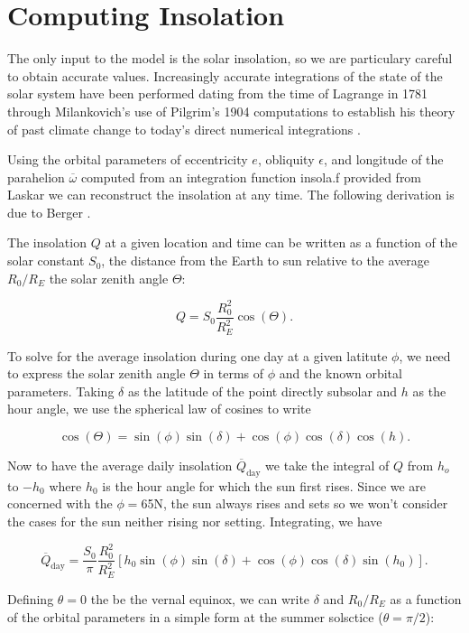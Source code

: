 \section{Computing Insolation}

The only input to the model is the solar insolation, so we are particulary careful to obtain accurate values.
Increasingly accurate integrations of the state of the solar system have been performed dating from the time of Lagrange in 1781 through Milankovich's use of Pilgrim's 1904 computations to establish his theory of past climate change to today's direct numerical integrations \cite{laskar2004long}.

Using the orbital parameters of eccentricity $e$, obliquity $\epsilon$, and longitude of the parahelion $\overline{\omega}$ computed from an integration function insola.f provided from Laskar \cite{laskar2004long} we can reconstruct the insolation at any time.
The following derivation is due to Berger \cite{berger1981long}.

The insolation $Q$ at a given location and time can be written as a function of the solar constant $S_0$, the distance from the Earth to sun relative to the average $R_0/R_E$ the solar zenith angle $\Theta$:

$$ Q = S_0 \frac{R_0^2}{R_E^2} \cos (\Theta) .$$

To solve for the average insolation during one day at a given latitute $\phi$, we need to express the solar zenith angle $\Theta$ in terms of $\phi$ and the known orbital parameters.
Taking $\delta$ as the latitude of the point directly subsolar and $h$ as the hour angle, we use the spherical law of cosines to write

$$ \cos ( \Theta ) = \sin ( \phi ) \sin ( \delta ) + \cos ( \phi ) \cos ( \delta ) \cos ( h ) .$$

Now to have the average daily insolation $\overline{Q} _\text{day}$ we take the integral of $Q$ from $h_o $ to $-h_0$ where $h_0$ is the hour angle for which the sun first rises.
Since we are concerned with the $\phi = $65N, the sun always rises and sets so we won't consider the cases for the sun neither rising nor setting.
Integrating, we have

$$ \overline{Q} _\text{day} = \frac{S_0}{\pi } \frac{R_0^2}{R_E^2} \left [ h_0 \sin (\phi) \sin (\delta) + \cos (\phi) \cos (\delta) \sin (h_0) \right ] . $$

Defining $\theta = 0$ the be the vernal equinox, we can write $\delta$ and $R_0/R_E$ as a function of the orbital parameters in a simple form at the summer solsctice ($\theta = \pi /2$):


